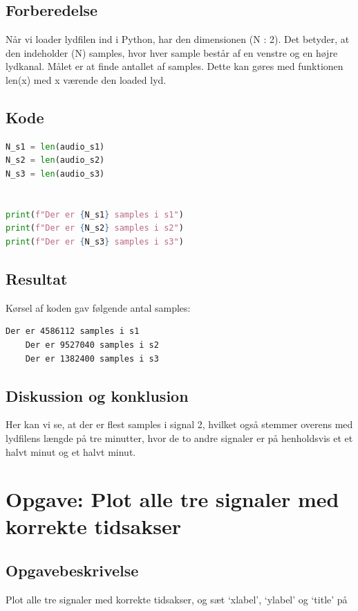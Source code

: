 \documentclass[11pt,a4paper]{report}
\begin{document}
\subsection{Forberedelse}
Når vi loader lydfilen ind i Python, har den dimensionen (N : 2). Det betyder, at den indeholder (N) samples, hvor hver sample består af en venstre og en højre lydkanal. Målet er at finde antallet af samples. Dette kan gøres med funktionen len(x) med x værende den loaded lyd.

\subsection{Kode}
\begin{lstlisting}[language=Python]
N_s1 = len(audio_s1)
N_s2 = len(audio_s2)
N_s3 = len(audio_s3)


print(f"Der er {N_s1} samples i s1")
print(f"Der er {N_s2} samples i s2")
print(f"Der er {N_s3} samples i s3")
\end{lstlisting}

\subsection{Resultat}
Kørsel af koden gav følgende antal samples:

\begin{lstlisting}[language=Bash]
    Der er 4586112 samples i s1
    Der er 9527040 samples i s2
    Der er 1382400 samples i s3
\end{lstlisting}

\subsection{Diskussion og konklusion}
Her kan vi se, at der er flest samples i signal 2, hvilket også stemmer overens med lydfilens længde på tre minutter, hvor de to andre signaler er på henholdsvis et et halvt minut og et halvt minut.

\newpage
\section{Opgave: Plot alle tre signaler med korrekte tidsakser}
\subsection{Opgavebeskrivelse}
Plot alle tre signaler med korrekte tidsakser, og sæt ‘xlabel’, ‘ylabel’ og ‘title’ på
\end{document}
